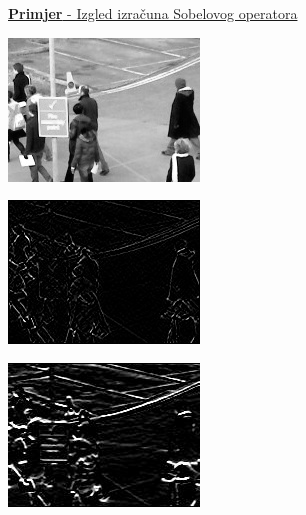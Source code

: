 \documentclass[times, utf8, zavrsni, numeric]{fer}
\begin{document}
\underline{\textbf{Primjer} - Izgled izračuna Sobelovog operatora}

\begin{multicols}{2}

\begin{minipage}{\linewidth}
\centering
\includegraphics[width=0.8\linewidth]{img/2982.jpg}
\end{minipage}

\begin{minipage}{\linewidth}
\centering
\includegraphics[width=0.8\linewidth]{img/sobel.jpg}
\end{minipage}

\begin{minipage}{\linewidth}
\centering
\includegraphics[width=0.8\linewidth]{img/sobely.jpg}
\end{minipage}


\end{multicols}
\end{document}
